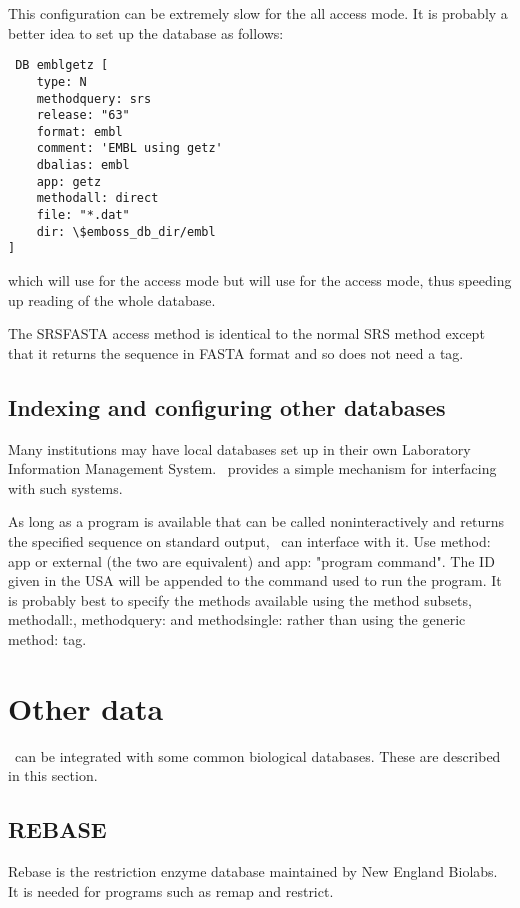\documentclass{report}
\begin{document}
This configuration can be extremely slow for the all access mode. It
is probably a better idea to set up the database as follows:

\begin{verbatim}
 DB emblgetz [ 
    type: N 
    methodquery: srs 
    release: "63" 
    format: embl
    comment: 'EMBL using getz' 
    dbalias: embl 
    app: getz 
    methodall: direct
    file: "*.dat"
    dir: \$emboss_db_dir/embl
]
\end{verbatim}

which will use  for the  access mode
but will use  for the  access mode,
thus speeding up reading of the whole database.

The SRSFASTA access method is identical to the normal SRS method
except that it returns the sequence in FASTA format and so does not
need a  tag.


\subsection{Indexing and configuring other databases}

Many institutions may have local databases set up in their own
Laboratory Information Management System. \EMBOSS\ provides a simple
mechanism for interfacing with such systems.

As long as a program is available that can be called noninteractively
and returns the specified sequence on standard output, \EMBOSS\ can
interface with it.  Use method: app or external (the two are
equivalent) and app: "program command".  The ID given in the USA will
be appended to the command used to run the program. It is probably
best to specify the methods available using the method subsets,
methodall:, methodquery: and methodsingle: rather than using the
generic method: tag.


\section{Other data}

\EMBOSS\ can be integrated with some common biological
databases. These are described in this section.

\subsection{REBASE}

Rebase is the restriction enzyme database maintained by New
England Biolabs. It is needed for programs such as remap and
restrict.
\end{document}
